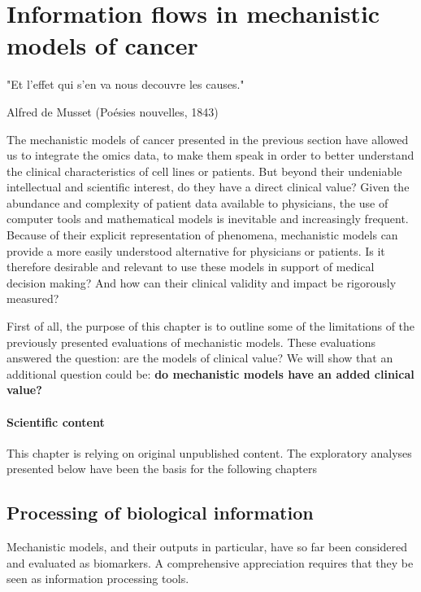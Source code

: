 \documentclass[a4paper,12pt,twoside,onecolumn,openright,final,oldfontcommands]{memoir}
\newcommand{\initial}[1]{
	\lettrine[lines=3,lhang=0.33,nindent=0em]{
		\color{gray}
     		{\textsc{#1}}}{}}
\let\BeginKnitrBlock\begin \let\EndKnitrBlock\end
\begin{document}
\chapter{Information flows in mechanistic models of
cancer}\label{information-flows-in-mechanistic-models-of-cancer}

\epigraph{"Et l'effet qui s'en va nous decouvre les causes."}{Alfred de Musset (Poésies nouvelles, 1843)}

\initial{T}he mechanistic models of cancer presented in the previous
section have allowed us to integrate the omics data, to make them speak
in order to better understand the clinical characteristics of cell lines
or patients. But beyond their undeniable intellectual and scientific
interest, do they have a direct clinical value? Given the abundance and
complexity of patient data available to physicians, the use of computer
tools and mathematical models is inevitable and increasingly frequent.
Because of their explicit representation of phenomena, mechanistic
models can provide a more easily understood alternative for physicians
or patients. Is it therefore desirable and relevant to use these models
in support of medical decision making? And how can their clinical
validity and impact be rigorously measured?

First of all, the purpose of this chapter is to outline some of the
limitations of the previously presented evaluations of mechanistic
models. These evaluations answered the question: are the models of
clinical value? We will show that an additional question could be:
\textbf{do mechanistic models have an added clinical value?}

\BeginKnitrBlock{summarybox}
\subsubsection*{Scientific content}\label{scientific-content-4}

This chapter is relying on original unpublished content. The exploratory
analyses presented below have been the basis for the following chapters
\EndKnitrBlock{summarybox}

\section{Processing of biological
information}\label{processing-of-biological-information}

Mechanistic models, and their outputs in particular, have so far been
considered and evaluated as biomarkers. A comprehensive appreciation
requires that they be seen as information processing tools.
\end{document}
